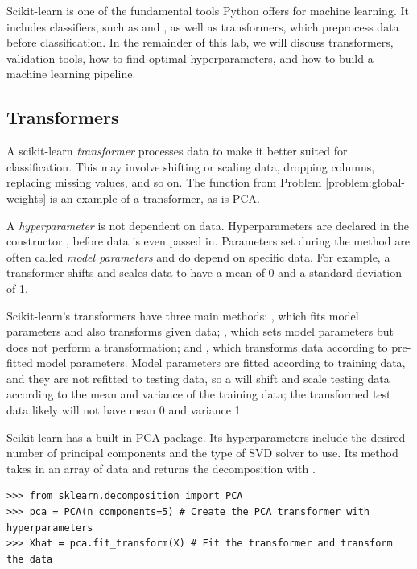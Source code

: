 Scikit-learn is one of the fundamental tools Python offers for machine learning.
It includes classifiers, such as  and , as well as transformers, which preprocess data before classification.
In the remainder of this lab, we will discuss transformers, validation tools, how to find optimal hyperparameters, and how to build a machine learning pipeline.

\subsection*{Transformers} %

A scikit-learn \emph{transformer} processes data to make it better suited for classification.
This may involve shifting or scaling data, dropping columns, replacing missing values, and so on.
The function from Problem \ref{problem:global-weights} is an example of a transformer, as is PCA.

\begin{info}
A \emph{hyperparameter} is not dependent on data.
Hyperparameters are declared in the constructor , before data is even passed in.
Parameters set during the  method are often called \emph{model parameters} and do depend on specific data.
For example, a  transformer shifts and scales data to have a mean of 0 and a standard deviation of 1.

Scikit-learn's transformers have three main methods: , which fits model parameters and also transforms given data; , which sets model parameters but does not perform a transformation; and , which transforms data according to pre-fitted model parameters.
Model parameters are fitted according to training data, and they are not refitted to testing data, so a  will shift and scale testing data according to the mean and variance of the training data; the transformed test data likely will not have mean 0 and variance 1.
\end{info}

Scikit-learn has a built-in PCA package.
Its hyperparameters include the desired number of principal components and the type of SVD solver to use.
Its  method takes in an array of data and returns the decomposition with .

\begin{lstlisting}
>>> from sklearn.decomposition import PCA
>>> pca = PCA(n_components=5) # Create the PCA transformer with hyperparameters
>>> Xhat = pca.fit_transform(X) # Fit the transformer and transform the data
\end{lstlisting}

